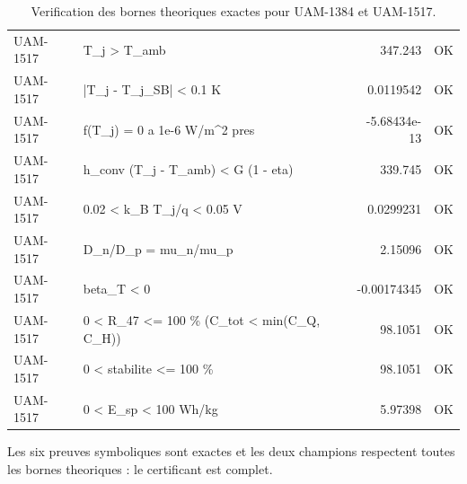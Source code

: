 \documentclass[11pt,a4paper,french]{article}
\begin{document}
\begin{table}[htbp]
\begin{tabular}{llrr}
UAM-1517 & T\_j > T\_amb & 347.243 & OK \\
UAM-1517 & |T\_j - T\_j\_SB| < 0.1 K & 0.0119542 & OK \\
UAM-1517 & f(T\_j) = 0 a 1e-6 W/m\textasciicircum{}2 pres & -5.68434e-13 & OK \\
UAM-1517 & h\_conv (T\_j - T\_amb) < G (1 - eta) & 339.745 & OK \\
UAM-1517 & 0.02 < k\_B T\_j/q < 0.05 V & 0.0299231 & OK \\
UAM-1517 & D\_n/D\_p = mu\_n/mu\_p & 2.15096 & OK \\
UAM-1517 & beta\_T < 0 & -0.00174345 & OK \\
UAM-1517 & 0 < R\_47 <= 100 \% (C\_tot < min(C\_Q, C\_H)) & 98.1051 & OK \\
UAM-1517 & 0 < stabilite <= 100 \% & 98.1051 & OK \\
UAM-1517 & 0 < E\_sp < 100 Wh/kg & 5.97398 & OK \\
\bottomrule
\end{tabular}
\caption{Verification des bornes theoriques exactes pour UAM-1384 et UAM-1517.}
\end{table}

\begin{tcolorbox}[colback=green!5,colframe=green!50!black,title=Conclusion]
Les six preuves symboliques sont exactes et les deux champions respectent toutes les bornes theoriques : le certificant est complet.
\end{tcolorbox}
\end{document}
